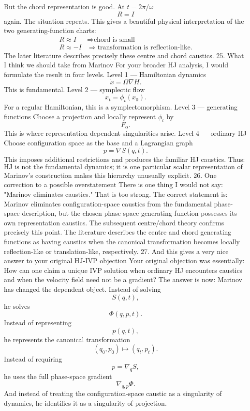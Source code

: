 But the chord representation is good.
At \(t=2\pi/\omega\)
$$ R=I $$
again.
The situation repeats.
This gives a beautiful physical interpretation of the two generating-function charts:
$$ \boxed{ \begin{array}{cc} 
R\approx I &\Rightarrow \text{chord is small}\\
R\approx-I &\Rightarrow \text{transformation is reflection-like}. 
\end{array}} $$
The later literature describes precisely these centre and chord caustics.
25. What I think we should take from Marinov
For your broader HJ analysis, I would formulate the result in four levels.
Level 1 — Hamiltonian dynamics
$$ \dot x=\Omega\nabla H. $$
This is fundamental.
Level 2 — symplectic flow
$$ x_t=\phi_t(x_0). $$
For a regular Hamiltonian, this is a symplectomorphism.
Level 3 — generating functions
Choose a projection and locally represent \(\phi_t\) by
$$ F_\alpha. $$
This is where representation-dependent singularities arise.
Level 4 — ordinary HJ
Choose configuration space as the base and a Lagrangian graph
$$ p=\nabla S(q,t). $$
This imposes additional restrictions and produces the familiar HJ caustics.
Thus:
$$ \boxed{ \text{HJ is not the fundamental dynamics; it is one particular scalar representation of symplectic dynamics.} } $$
Marinov's construction makes this hierarchy unusually explicit.
26. One correction to a possible overstatement
There is one thing I would not say:
"Marinov eliminates caustics."
That is too strong.
The correct statement is:
Marinov eliminates configuration-space caustics from the fundamental phase-space description, but the chosen phase-space generating function possesses its own representation caustics.
The subsequent centre/chord theory confirms precisely this point. The literature describes the centre and chord generating functions as having caustics when the canonical transformation becomes locally reflection-like or translation-like, respectively.
27. And this gives a very nice answer to your original HJ-IVP objection
Your original objection was essentially:
How can one claim a unique IVP solution when ordinary HJ encounters caustics and when the velocity field need not be a gradient?
The answer is now:
Marinov has changed the dependent object.
Instead of solving
$$ S(q,t), $$
he solves
$$ \Phi(q,p,t). $$
Instead of representing
$$ p(q,t), $$
he represents the canonical transformation
$$ (q_0,p_0)\mapsto(q_t,p_t). $$
Instead of requiring
$$ p=\nabla_qS, $$
he uses the full phase-space gradient
$$ \nabla_{q,p}\Phi. $$
And instead of treating the configuration-space caustic as a singularity of dynamics, he identifies it as a singularity of projection.
